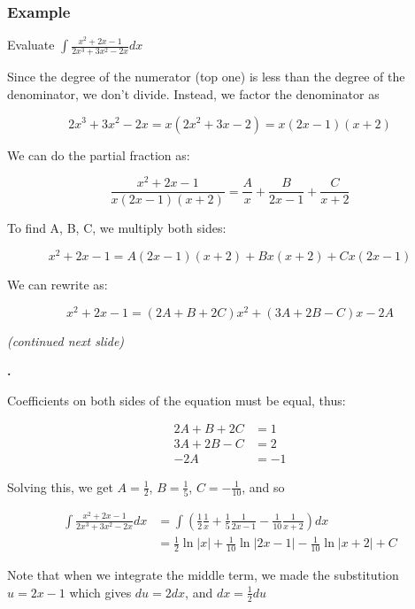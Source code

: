 \documentclass[t]{beamer}
\theoremstyle{plain}
\theoremstyle{definition}
\newcounter{heading}
\newcommand{\newhead}[1]{\medskip\stepcounter{heading}\noindent\textbf{\hspace{0.2cm}{#1}.}}
\begin{document}
\begin{frame}
\footnotesize
\frametitle{Example}

Evaluate $\displaystyle\int\frac{x^2 + 2x - 1}{2x^3 + 3x^2 - 2x}dx$ \pause

\medskip

Since the degree of the numerator (top one) is less than the degree of the denominator, we don't divide.  Instead, we factor the denominator as

$$2x^3 + 3x^2 - 2x = x(2x^2 + 3x - 2) = x(2x - 1)(x + 2)$$

We can do the partial fraction as:

$$\frac{x^2 + 2x - 1}{x(2x - 1)(x + 2)} = \frac{A}{x} + \frac{B}{2x - 1} + \frac{C}{x + 2}$$

To find A, B, C, we multiply both sides:

$$x^2 + 2x - 1 = A(2x - 1)(x + 2) + Bx(x + 2) + Cx(2x - 1)$$

We can rewrite as:

$$x^2 + 2x - 1 = (2A + B + 2C)x^2 + (3A + 2B - C)x - 2A$$

\textit{(continued next slide)}

\end{frame}

\begin{frame}
\footnotesize

\newhead{continued...}

Coefficients on both sides of the equation must be equal, thus:

\begin{align*}
2A + B + 2C &= 1\\
3A + 2B - C &= 2\\
-2A &= -1
\end{align*}

Solving this, we get $A = \frac{1}{2}$, $B = \frac{1}{5}$, $C = -\frac{1}{10}$, and so

\begin{align*}
\int\frac{x^2 + 2x - 1}{2x^3 + 3x^2 - 2x}dx &= \int\left(\frac{1}{2}\frac{1}{x} + \frac{1}{5}\frac{1}{2x - 1} - \frac{1}{10}\frac{1}{x + 2}\right)dx\\
&= \frac{1}{2}\ln|x| + \frac{1}{10}\ln|2x - 1| - \frac{1}{10}\ln|x + 2| + C
\end{align*}

Note that when we integrate the middle term, we made the substitution $u = 2x - 1$ which gives $du = 2dx$, and $dx = \frac{1}{2}du$

\end{frame}
\end{document}
